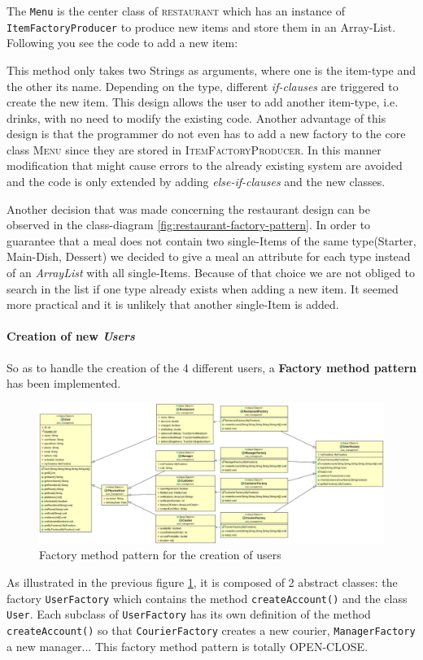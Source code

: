 The \lstinline|Menu| is the center class of \textsc{restaurant} which has an instance of 
\lstinline|ItemFactoryProducer| to produce new items and store them in an Array-List. Following you
see the code to add a new item:



This method only takes two Strings as arguments, where one is the item-type and the other its
name. Depending on the type, different \textit{if-clauses} are triggered to create the new item.
This design allows the user to add another item-type, i.e. drinks, with no need to modify the
existing code. Another advantage of this design is that the programmer do not even has to add a new
factory to the core class \textsc{Menu} since they are stored in \textsc{ItemFactoryProducer}. In
this manner modification that might cause errors to the already existing system are avoided and
the code is only extended by adding \textit{else-if-clauses} and the new classes. 

Another decision that was made concerning the restaurant design can be observed in the
class-diagram \ref{fig:restaurant-factory-pattern}. In order to guarantee that a meal does not
contain two single-Items of the same type(Starter, Main-Dish, Dessert) we decided to give a meal an
attribute for each type instead of an \textit{ArrayList} with all single-Items. Because of that
choice we are not obliged to search in the list if one type already exists when adding a new item.
It seemed more practical and it is unlikely that another single-Item is added.

\paragraph{Creation of new \textit{Users}}
So as to handle the creation of the 4 different users, a \textbf{Factory method pattern} has been implemented.
\begin{figure}[H]
	\centering
	\includegraphics[width=1\linewidth]{./ima/userFactory.jpg}
	\caption{Factory method pattern for the creation of users}
	\label{fig:user-factory-pattern}
\end{figure}
As illustrated in the previous figure \ref{fig:user-factory-pattern}, it is composed of 2 abstract classes: the factory \lstinline|UserFactory| which contains the method \lstinline|createAccount()| and the class \lstinline|User|. Each subclass of \lstinline|UserFactory| has its own definition of the method \lstinline|createAccount()| so that \lstinline|CourierFactory| creates a new courier, \lstinline|ManagerFactory| a new manager... This factory method pattern is totally OPEN-CLOSE.
